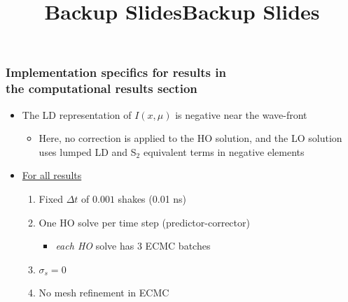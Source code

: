 \documentclass[xcolor=dvipsnames,hyperref={pdfpagelabels=false},unknownkeysallowed]{beamer}
\renewcommand{\u}[1]{\underline{#1}}
\newlength{\wideitemsep}
\let\olditem\item
\renewcommand{\item}{\setlength{\itemsep}{\wideitemsep}\olditem}
\begin{document}
\date{}
\title{Backup Slides}
\begin{frame}
    \vspace{-0.21in}
    \titlepage \vspace{-0.2113in}
\end{frame}

\appendix
{}
\setcounter{finalframe}{\value{framenumber}}

\title{Backup Slides}
\author{}
\date{}
\begin{frame}
    \frametitle{Implementation specifics for results in  \\ the computational
                results section }
    \begin{itemize}
    \item The LD representation of $I(x,\mu)$ is negative near the wave-front
        \begin{itemize}
            \item Here, no correction is applied to the HO solution, and the LO
                solution uses lumped LD and S$_2$ equivalent terms in negative elements
        \end{itemize}
     
 \item \u{For all results}
        \begin{enumerate}
    \item Fixed $\Delta t$ of $0.001$ shakes (0.01 ns)
    \item One HO solve per time step (predictor-corrector)
        \begin{itemize}
            \item \emph{each HO} solve has 3 ECMC batches
        \end{itemize}
    \item $\sigma_s=0$
    \item No mesh refinement in ECMC
    \end{enumerate} 
    \end{itemize}
\end{frame}
\end{document}
